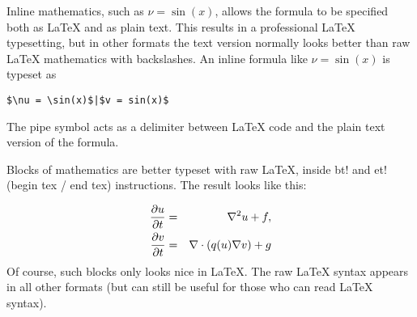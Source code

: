 \documentclass{article}
\begin{document}
Inline mathematics, such as $\nu = \sin(x)$,
allows the formula to be specified both as {\LaTeX} and as plain text.
This results in a professional {\LaTeX} typesetting, but in other formats
the text version normally looks better than raw {\LaTeX} mathematics with
backslashes. An inline formula like $\nu = \sin(x)$ is
typeset as
\begin{Verbatim}[fontsize=\fontsize{9pt}{9pt},tabsize=8,baselinestretch=0.85,
fontfamily=tt,xleftmargin=7mm]
$\nu = \sin(x)$|$v = sin(x)$
\end{Verbatim}
\noindent
The pipe symbol acts as a delimiter between {\LaTeX} code and the plain text
version of the formula.

Blocks of mathematics are better typeset with raw {\LaTeX}, inside
{\fontsize{10pt}{10pt}\verb!!bt!} and {\fontsize{10pt}{10pt}\verb!!et!} (begin tex / end tex) instructions. 
The result looks like this:

\begin{eqnarray}
{\partial u\over\partial t} &=& \nabla^2 u + f,\label{myeq1}\\
{\partial v\over\partial t} &=& \nabla\cdot(q(u)\nabla v) + g
\end{eqnarray}
Of course, such blocks only looks nice in {\LaTeX}. The raw
{\LaTeX} syntax appears in all other formats (but can still be useful
for those who can read {\LaTeX} syntax).
\end{document}
